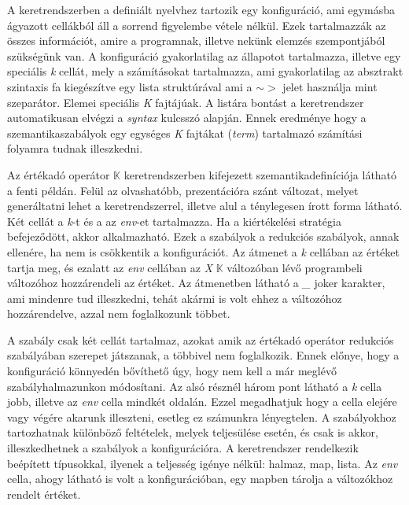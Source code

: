 

A keretrendszerben a definiált nyelvhez tartozik egy konfiguráció, ami egymásba ágyazott cellákból áll a sorrend figyelembe vétele nélkül. Ezek tartalmazzák az összes információt, amire a programnak, illetve nekünk elemzés szempontjából szükségünk van. A konfiguráció gyakorlatilag az állapotot tartalmazza, illetve egy speciális \textit{k} cellát, mely a számításokat tartalmazza, ami gyakorlatilag az absztrakt szintaxis fa kiegészítve egy lista struktúrával ami a $\sim>$ jelet használja mint szeparátor. Elemei speciális \textit{K} fajtájúak. A listára bontást a keretrendszer automatikusan elvégzi a \textit{syntax} kulcsszó alapján. Ennek eredménye hogy a szemantikaszabályok egy egységes \textit{K} fajtákat (\textit{term}) tartalmazó számítási folyamra tudnak illeszkedni.



Az értékadó operátor $\mathbb{K}$ keretrendszerben kifejezett szemantikadefiníciója látható a fenti példán. Felül az olvashatóbb, prezentációra szánt változat, melyet generáltatni lehet a keretrendszerrel, illetve alul a ténylegesen írott forma látható. Két cellát a \textit{k}-t és a az \textit{env}-et tartalmazza. Ha a kiértékelési stratégia befejeződött, akkor alkalmazható. Ezek a szabályok a redukciós szabályok, annak ellenére, ha nem is csökkentik a konfigurációt. Az átmenet a \textit{k} cellában az értéket tartja meg, és ezalatt az \textit{env} cellában az \textit{X} $\mathbb{K}$ változóban lévő programbeli változóhoz hozzárendeli az értéket. Az átmenetben látható a \textit{\_} joker karakter, ami mindenre tud illeszkedni, tehát akármi is volt ehhez a változóhoz hozzárendelve, azzal nem foglalkozunk többet.

A szabály csak két cellát tartalmaz, azokat amik az értékadó operátor redukciós szabályában szerepet játszanak, a többivel nem foglalkozik. Ennek előnye, hogy a konfiguráció könnyedén bővíthető úgy, hogy nem kell a már meglévő szabályhalmazunkon módosítani. Az alsó résznél három pont látható a \textit{k} cella jobb, illetve az \textit{env} cella mindkét oldalán. Ezzel megadhatjuk hogy a cella elejére vagy végére akarunk illeszteni, esetleg ez számunkra lényegtelen. A szabályokhoz tartozhatnak különböző feltételek, melyek teljesülése esetén, és csak is akkor, illeszkedhetnek a szabályok a konfigurációra. A keretrendszer rendelkezik beépített típusokkal, ilyenek a teljesség igénye nélkül: halmaz, map, lista. Az \textit{env} cella, ahogy látható is volt a konfigurációban, egy mapben tárolja a változókhoz rendelt értéket.

